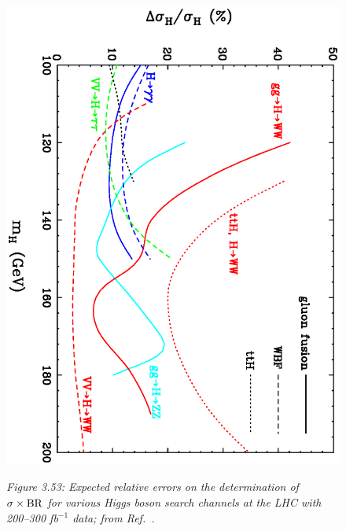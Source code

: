\begin{figure}[!h]
\vspace*{1mm}
\begin{center}
\includegraphics[width=9.cm, angle=90]{./sm3/LHC-couplings.ps}
\end{center}
\vspace*{-1mm}
{\it Figure 3.53: Expected relative errors on the determination of 
$\sigma \times {\rm BR}$ for various Higgs boson search channels at the LHC 
with 200--300 fb$^{-1}$ data; from Ref.~\cite{Zepp-meas}.}
 \label{fig:delsigh}
\vspace*{-.0cm}
 \end{figure}



